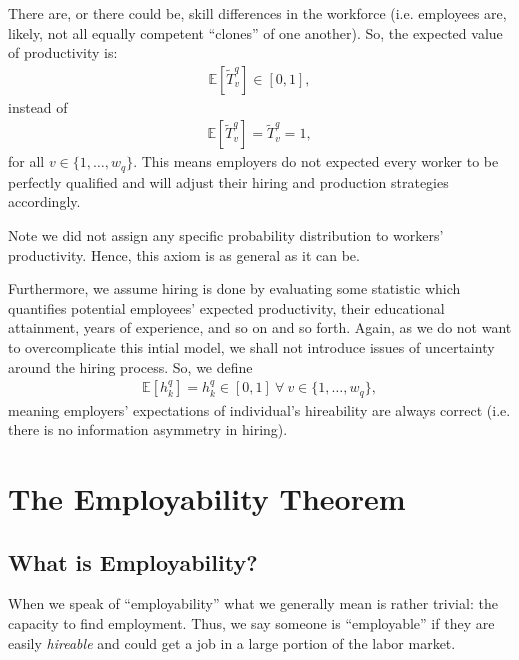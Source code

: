 \documentclass[hidelinks, nonatbib]{elsarticle}
\begin{document}
\begin{axiom}
    There are, or there could be, skill differences in the workforce (i.e. employees are, likely, not all equally competent ``clones'' of one another). So, the expected value of productivity is:
    \begin{gather}
        \mathbb{E}[
            \tilde{T}_{v}^{q}
        ]
        \in
        [0,1]
        ,
    \end{gather}
    instead of 
    \begin{gather}
        \mathbb{E}[
            \tilde{T}_{v}^{q}
        ]
        =
        \tilde{T}_{v}^{q}
        = 1
        ,
    \end{gather}
    for all $v \in \{1, \dots, w_q\}$. This means employers do not expected every worker to be perfectly qualified and will adjust their hiring and production strategies accordingly.
    
    Note we did not assign any specific probability distribution to workers' productivity. Hence, this axiom is as general as it can be.
\end{axiom}

\begin{axiom}
    \label{ha}
    Furthermore, we assume hiring is done by evaluating some statistic which quantifies potential employees' expected productivity, their educational attainment, years of experience, and so on and so forth. Again, as we do not want to overcomplicate this intial model, we shall not introduce issues of uncertainty around the hiring process. So, we define
    \begin{gather}
        \mathbb{E}[h_{k}^{q}]
        =
        h_{k}^{q}
        \in
        [0,1]
        \
        \forall
        \
        v \in \{1, \dots, w_q\}
        ,
    \end{gather}
    meaning employers' expectations of individual's hireability are always correct (i.e. there is no information asymmetry in hiring).
\end{axiom}

\section{The Employability Theorem}
\subsection{What is Employability?}
When we speak of ``employability'' what we generally mean is rather trivial: the capacity to find employment. Thus, we say someone is ``employable'' if they are easily \textit{hireable} and could get a job in a large portion of the labor market.
\end{document}
